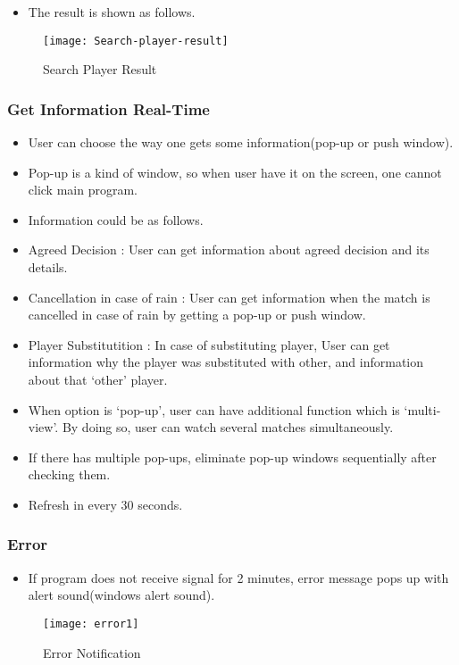 \documentclass[conference,compsoc, twocolumn]{IEEEtran}
\begin{document}
\begin{itemize}
\item The result is shown as follows.
\end{itemize}
\begin{figure}[H]
\centering\texttt{[image: Search-player-result]}
\caption{Search Player Result}
\end{figure}


\subsubsection{Get Information Real-Time}
\begin{itemize}
\item User can choose the way one gets some information(pop-up or push window).
\item Pop-up is a kind of window, so when user have it on the screen, one cannot click main program.
\item Information could be as follows.
\item Agreed Decision : User can get information about agreed decision and its details.
\item Cancellation in case of rain : User can get information when the match is cancelled in case of rain by getting a pop-up or push window.
\item Player Substitutition : In case of substituting player, User can get information why the player was substituted with other, and information about that ‘other’  player.
\item When option is ‘pop-up’, user can have additional function which is ‘multi-view’.  By doing so, user can watch several matches simultaneously.
\item If there has multiple pop-ups, eliminate pop-up windows sequentially after checking them.
\item Refresh in every 30 seconds.
\end{itemize}



\subsubsection{Error}
\begin{itemize}
\item  If program does not receive signal for 2 minutes, error message pops up with alert sound(windows alert sound).
\end{itemize}
\begin{figure}[H]
\centering\texttt{[image: error1]}
\caption{Error Notification}
\end{figure}
\end{document}
